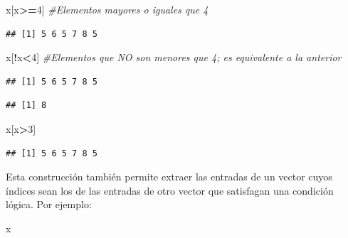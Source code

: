 \documentclass[]{book}
\newenvironment{Shaded}{\begin{snugshade}}{\end{snugshade}}
\newcommand{\CommentTok}[1]{\textcolor[rgb]{0.56,0.35,0.01}{\textit{#1}}}
\newcommand{\DecValTok}[1]{\textcolor[rgb]{0.00,0.00,0.81}{#1}}
\newcommand{\NormalTok}[1]{#1}
\newcommand{\OperatorTok}[1]{\textcolor[rgb]{0.81,0.36,0.00}{\textbf{#1}}}
\theoremstyle{definition}
\theoremstyle{definition}
\theoremstyle{definition}
\theoremstyle{remark}
\begin{document}
\begin{Shaded}
\begin{Highlighting}[]
\NormalTok{x[x}\OperatorTok{>=}\DecValTok{4}\NormalTok{] }\CommentTok{#Elementos mayores o iguales que 4}
\end{Highlighting}
\end{Shaded}

\begin{verbatim}
## [1] 5 6 5 7 8 5
\end{verbatim}

\begin{Shaded}
\begin{Highlighting}[]
\NormalTok{x[}\OperatorTok{!}\NormalTok{x}\OperatorTok{<}\DecValTok{4}\NormalTok{] }\CommentTok{#Elementos que NO son menores que 4; es equivalente a la anterior}
\end{Highlighting}
\end{Shaded}

\begin{verbatim}
## [1] 5 6 5 7 8 5
\end{verbatim}

\begin{Shaded}
\end{Shaded}

\begin{verbatim}
## [1] 8
\end{verbatim}

\begin{Shaded}
\begin{Highlighting}[]
\NormalTok{x[x}\OperatorTok{>}\DecValTok{3}\NormalTok{] }
\end{Highlighting}
\end{Shaded}

\begin{verbatim}
## [1] 5 6 5 7 8 5
\end{verbatim}

Esta construcción también permite extraer las entradas de un vector cuyos índices sean los de las entradas de otro vector que satisfagan una condición lógica. Por ejemplo:

\begin{Shaded}
\begin{Highlighting}[]
\NormalTok{x}
\end{Highlighting}
\end{Shaded}
\end{document}

